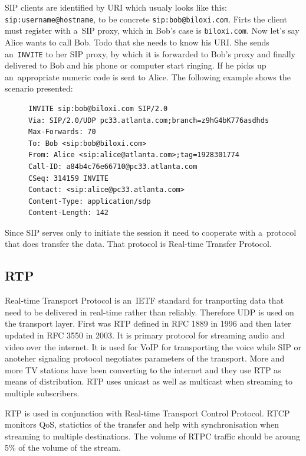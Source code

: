 SIP clients are identified by URI which usualy looks like this: \verb|sip:username@hostname|, to be concrete \verb|sip:bob@biloxi.com|. Firts the client must register with a~SIP proxy, which in Bob's case is \verb|biloxi.com|. Now let's say Alice wants to call Bob. Todo that she needs to know his URI. She sends an~\verb|INVITE| to her SIP proxy, by which it is forwarded to Bob's proxy and finally delivered to Bob and his phone or computer start ringing. If he picks up an~appropriate numeric code is sent to Alice. The following example\cite{SIPRFC} shows the scenario presented:    

\begin{figure}[h]
\begin{lstlisting}
INVITE sip:bob@biloxi.com SIP/2.0
Via: SIP/2.0/UDP pc33.atlanta.com;branch=z9hG4bK776asdhds
Max-Forwards: 70
To: Bob <sip:bob@biloxi.com>
From: Alice <sip:alice@atlanta.com>;tag=1928301774
Call-ID: a84b4c76e66710@pc33.atlanta.com
CSeq: 314159 INVITE
Contact: <sip:alice@pc33.atlanta.com>
Content-Type: application/sdp
Content-Length: 142
\end{lstlisting}
\end{figure}

Since SIP serves only to initiate the session it need to cooperate with a~protocol that does transfer the data. That protocol is Real-time Transfer Protocol.  

\subsection*{RTP}
Real-time Transport Protocol is an~IETF standard for tranporting data that need to be delivered in real-time rather than reliably. Therefore UDP is used on the transport layer. First was RTP defined in RFC 1889 in 1996 and then later updated in RFC 3550 in 2003. It is primary protocol for streaming audio and video over the internet. It is used for VoIP for transporting the voice while SIP or anoteher signaling protocol negotiates parameters of the transport. More and more TV stations have been converting to the internet and they use RTP as means of distribution. RTP uses unicast as well as multicast when streaming to multiple subscribers.

RTP is used in conjunction with Real-time Transport Control Protocol. RTCP monitors QoS, statictics of the transfer and help with synchronisation when streaming to multiple destinations. The volume of RTPC traffic should be aroung 5\% of the volume of the stream.  

